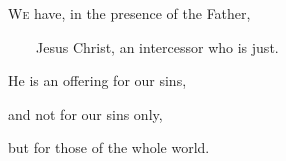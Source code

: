 \lettrine[lines=2,loversize=0.15]{W}{e} have, in the presence of the Father,\par
~~~~Jesus Christ, an intercessor who is just.\par
\noindent He is an offering for our sins,\par
\noindent and not for our sins only,\par
\noindent but for those of the whole world.